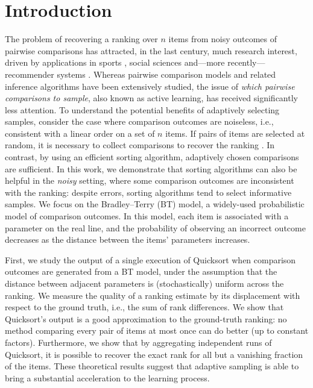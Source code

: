 \section{Introduction}  %
\label{rs:sec:intro}

The problem of recovering a ranking over $n$ items from noisy outcomes of pairwise comparisons has attracted, in the last century, much research interest, driven by applications in sports \citep{elo1978rating}, social sciences \citep{thurstone1927law, salganik2015wiki} and---more recently---recommender systems \citep{houlsby2012collaborative}.
Whereas pairwise comparison models and related inference algorithms have been extensively studied, the issue of \emph{which pairwise comparisons to sample}, also known as active learning, has received significantly less attention.
To understand the potential benefits of adaptively selecting samples, consider the case where comparison outcomes are noiseless, i.e., consistent with a linear order on a set of $n$ items.
If pairs of items are selected at random, it is necessary to collect  comparisons to recover the ranking \citep{alon1994linear}.
In contrast, by using an efficient sorting algorithm,  adaptively chosen comparisons are sufficient.
In this work, we demonstrate that sorting algorithms can also be helpful in the \emph{noisy} setting, where some comparison outcomes are inconsistent with the ranking: despite errors, sorting algorithms tend to select informative samples.
We focus on the Bradley--Terry (BT) model, a widely-used probabilistic model of comparison outcomes.
In this model, each item is associated with a parameter on the real line, and the probability of observing an incorrect outcome decreases as the distance between the items' parameters increases.

First, we study the output of a single execution of Quicksort when comparison outcomes are generated from a BT model, under the assumption that the distance between adjacent parameters is (stochastically) uniform across the ranking.
We measure the quality of a ranking estimate by its displacement with respect to the ground truth, i.e., the sum of rank differences.
We show that Quicksort's output is a good approximation to the ground-truth ranking: no method comparing every pair of items at most once can do better (up to constant factors).
Furthermore, we show that by aggregating  independent runs of Quicksort, it is possible to recover the exact rank for all but a vanishing fraction of the items.
These theoretical results suggest that adaptive sampling is able to bring a substantial acceleration to the learning process.

